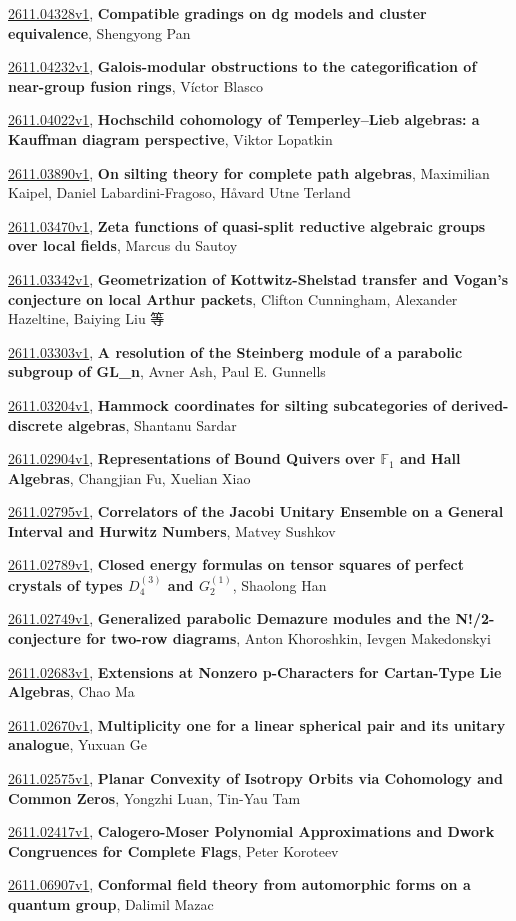 \documentclass[9pt, a4paper]{article}
\theoremstyle{plain}
\theoremstyle{definition}
\theoremstyle{remark}
\newcommand{\arxiv}[3]{\href{https://arxiv.org/abs/#1}{#1}, \textbf{\textcolor{arxivblue}{#2}}, #3}
\begin{document}
\arxiv{2611.04328v1}{Compatible gradings on dg models and cluster equivalence}{Shengyong Pan}

\arxiv{2611.04232v1}{Galois-modular obstructions to the categorification of near-group fusion rings}{Víctor Blasco}

\arxiv{2611.04022v1}{Hochschild cohomology of Temperley--Lieb algebras: a Kauffman diagram perspective}{Viktor Lopatkin}

\arxiv{2611.03890v1}{On silting theory for complete path algebras}{Maximilian Kaipel, Daniel Labardini-Fragoso, Håvard Utne Terland}

\arxiv{2611.03470v1}{Zeta functions of quasi-split reductive algebraic groups over local fields}{Marcus du Sautoy}

\arxiv{2611.03342v1}{Geometrization of Kottwitz-Shelstad transfer and Vogan's conjecture on local Arthur packets}{Clifton Cunningham, Alexander Hazeltine, Baiying Liu 等}

\arxiv{2611.03303v1}{A resolution of the Steinberg module of a parabolic subgroup of GL_n}{Avner Ash, Paul E. Gunnells}

\arxiv{2611.03204v1}{Hammock coordinates for silting subcategories of derived-discrete algebras}{Shantanu Sardar}

\arxiv{2611.02904v1}{Representations of Bound Quivers over $\mathbb{F}_1$ and Hall Algebras}{Changjian Fu, Xuelian Xiao}

\arxiv{2611.02795v1}{Correlators of the Jacobi Unitary Ensemble on a General Interval and Hurwitz Numbers}{Matvey Sushkov}

\arxiv{2611.02789v1}{Closed energy formulas on tensor squares of perfect crystals of types $D_4^{(3)}$ and $G_2^{(1)}$}{Shaolong Han}

\arxiv{2611.02749v1}{Generalized parabolic Demazure modules and the N!/2-conjecture for two-row diagrams}{Anton Khoroshkin, Ievgen Makedonskyi}

\arxiv{2611.02683v1}{Extensions at Nonzero p-Characters for Cartan-Type Lie Algebras}{Chao Ma}

\arxiv{2611.02670v1}{Multiplicity one for a linear spherical pair and its unitary analogue}{Yuxuan Ge}

\arxiv{2611.02575v1}{Planar Convexity of Isotropy Orbits via Cohomology and Common Zeros}{Yongzhi Luan, Tin-Yau Tam}

\arxiv{2611.02417v1}{Calogero-Moser Polynomial Approximations and Dwork Congruences for Complete Flags}{Peter Koroteev}

\arxiv{2611.06907v1}{Conformal field theory from automorphic forms on a quantum group}{Dalimil Mazac}
\end{document}
